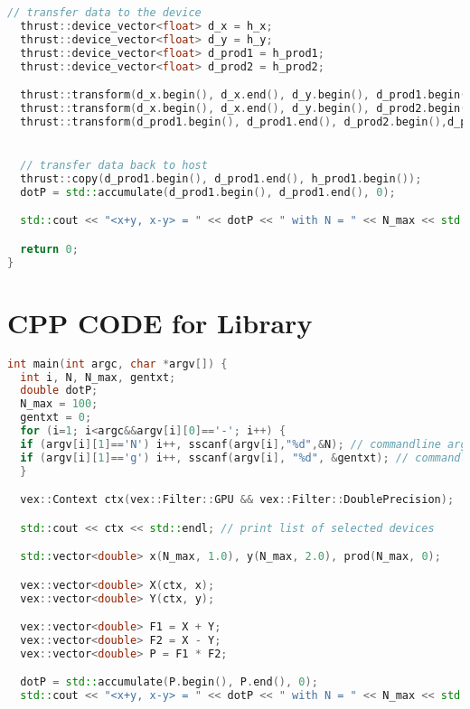 \begin{appendix}
\begin{lstlisting}[language=C++, title=CPP CODE for \fun{Thrust} Library]
  // transfer data to the device
  thrust::device_vector<float> d_x = h_x;
  thrust::device_vector<float> d_y = h_y;
  thrust::device_vector<float> d_prod1 = h_prod1;
  thrust::device_vector<float> d_prod2 = h_prod2;

  thrust::transform(d_x.begin(), d_x.end(), d_y.begin(), d_prod1.begin(), thrust::plus<float>());
  thrust::transform(d_x.begin(), d_x.end(), d_y.begin(), d_prod2.begin(), thrust::minus<float>());
  thrust::transform(d_prod1.begin(), d_prod1.end(), d_prod2.begin(),d_prod1.begin(), thrust::multiplies<float>());


  // transfer data back to host
  thrust::copy(d_prod1.begin(), d_prod1.end(), h_prod1.begin());
  dotP = std::accumulate(d_prod1.begin(), d_prod1.end(), 0);

  std::cout << "<x+y, x-y> = " << dotP << " with N = " << N_max << std::endl;

  return 0;
}
\end{lstlisting}

\pagebreak

\section{CPP CODE for  Library}
\label{app_1c}
\begin{lstlisting}[language=C++, title=CPP CODE for \fun{VexCL} Library]
int main(int argc, char *argv[]) {
  int i, N, N_max, gentxt;
  double dotP;
  N_max = 100;
  gentxt = 0;
  for (i=1; i<argc&&argv[i][0]=='-'; i++) {
  if (argv[i][1]=='N') i++, sscanf(argv[i],"%d",&N); // commandline arg -N for adjusting max. count, if none given N=100
  if (argv[i][1]=='g') i++, sscanf(argv[i], "%d", &gentxt); // commandline arg. -g for generating a txt, if none given, no .txt NOT IMPLEMENTED
  }

  vex::Context ctx(vex::Filter::GPU && vex::Filter::DoublePrecision);

  std::cout << ctx << std::endl; // print list of selected devices

  std::vector<double> x(N_max, 1.0), y(N_max, 2.0), prod(N_max, 0);

  vex::vector<double> X(ctx, x);
  vex::vector<double> Y(ctx, y);

  vex::vector<double> F1 = X + Y;
  vex::vector<double> F2 = X - Y;
  vex::vector<double> P = F1 * F2;

  dotP = std::accumulate(P.begin(), P.end(), 0);
  std::cout << "<x+y, x-y> = " << dotP << " with N = " << N_max << std::endl;


\end{lstlisting}
\end{appendix}
